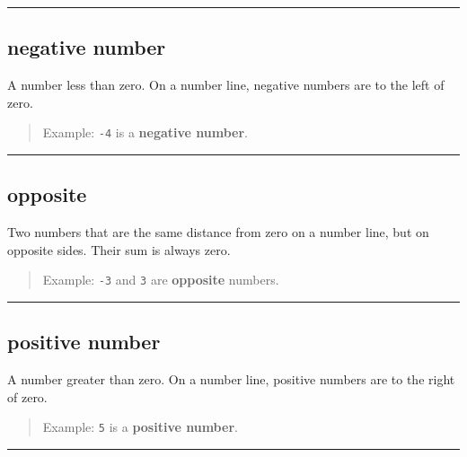 \documentclass[
  letterpaper,
]{scrrept}
\begin{document}
\begin{center}\rule{0.5\linewidth}{0.5pt}\end{center}

\subsection*{negative number}\label{glossary-negative-number}

A number less than zero. On a number line, negative numbers are to the
left of zero.

\begin{quote}
Example: \texttt{-4} is a \textbf{negative number}.
\end{quote}

\begin{center}\rule{0.5\linewidth}{0.5pt}\end{center}

\subsection*{opposite}\label{glossary-opposite}

Two numbers that are the same distance from zero on a number line, but
on opposite sides. Their sum is always zero.

\begin{quote}
Example: \texttt{-3} and \texttt{3} are \textbf{opposite} numbers.
\end{quote}

\begin{center}\rule{0.5\linewidth}{0.5pt}\end{center}

\subsection*{positive number}\label{glossary-positive-number}

A number greater than zero. On a number line, positive numbers are to
the right of zero.

\begin{quote}
Example: \texttt{5} is a \textbf{positive number}.
\end{quote}

\begin{center}\rule{0.5\linewidth}{0.5pt}\end{center}
\end{document}
